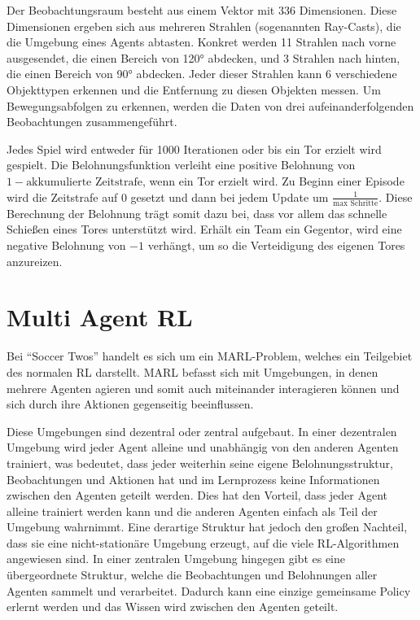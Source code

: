Der Beobachtungsraum besteht aus einem Vektor mit 336 Dimensionen. Diese Dimensionen ergeben sich aus mehreren Strahlen (sogenannten Ray-Casts), die die Umgebung eines Agents abtasten. Konkret werden 11 Strahlen nach vorne ausgesendet, die einen Bereich von 120° abdecken, und 3 Strahlen nach hinten, die einen Bereich von 90° abdecken. Jeder dieser Strahlen kann 6 verschiedene Objekttypen erkennen und die Entfernung zu diesen Objekten messen. Um Bewegungsabfolgen zu erkennen, werden die Daten von drei aufeinanderfolgenden Beobachtungen zusammengeführt. %

Jedes Spiel wird entweder für 1000 Iterationen oder bis ein Tor erzielt wird gespielt. Die Belohnungsfunktion verleiht eine positive Belohnung von \(1 - \text{akkumulierte Zeitstrafe}\), wenn ein Tor erzielt wird. Zu Beginn einer Episode wird die Zeitstrafe auf \(0\) gesetzt und dann bei jedem Update um \( \frac{1}{\text{max Schritte}} \). Diese Berechnung der Belohnung trägt somit dazu bei, dass vor allem das schnelle Schießen eines Tores unterstützt wird.  Erhält ein Team ein Gegentor, wird eine negative Belohnung von \(-1\) verhängt, um so die Verteidigung des eigenen Tores anzureizen.


\section{Multi Agent \acl{RL}}

Bei ``Soccer Twos'' handelt es sich um ein \ac{MARL}-Problem, welches ein Teilgebiet des normalen \ac{RL} darstellt. \ac{MARL} befasst sich mit Umgebungen, in denen mehrere Agenten agieren und somit auch miteinander interagieren können und sich durch ihre Aktionen gegenseitig beeinflussen.

Diese Umgebungen sind dezentral oder zentral aufgebaut. In einer dezentralen Umgebung wird jeder Agent alleine und unabhängig von den anderen Agenten trainiert, was bedeutet, dass jeder weiterhin seine eigene Belohnungsstruktur, Beobachtungen und Aktionen hat und im Lernprozess keine Informationen zwischen den Agenten geteilt werden. Dies hat den Vorteil, dass jeder Agent alleine trainiert werden kann und die anderen Agenten einfach als Teil der Umgebung wahrnimmt. Eine derartige Struktur hat jedoch den großen Nachteil, dass sie eine nicht-stationäre Umgebung erzeugt, auf die viele \ac{RL}-Algorithmen angewiesen sind.
In einer zentralen Umgebung hingegen gibt es eine übergeordnete Struktur, welche die Beobachtungen und Belohnungen aller Agenten sammelt und verarbeitet. Dadurch kann eine einzige gemeinsame Policy erlernt werden und das Wissen wird zwischen den Agenten geteilt. \cite{Tan:1993} %

